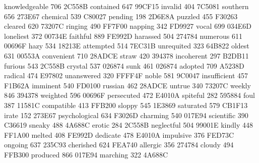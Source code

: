 knowledgeable 706 2C558B contained 647 99CF15 invalid 404 7C5081
southern 656 273E67 chemical 539 C80027 pending 198 2D6E8A puzzled 455
F30263 cleared 620 73207C ringing 490 FF7F00 napping 342 FD9927 vocal
699 034E6D loneliest 372 00734E faithful 889 FE992D harassed 504 274784
numerous 611 00696F hazy 534 18213E attempted 514 7EC31B unrequited 323
64B822 oldest 631 00553A convenient 710 28ADCE straw 420 394378
incoherent 297 B2DB11 furious 543 2C558B crystal 537 026874 sunk 461
026874 adopted 709 A5238D radical 474 E97802 unanswered 320 FFFF4F
noble 581 9C0047 insufficient 457 F1B62A imminent 540 FD0100 russian
462 28ADCE untrue 340 73207C weekly 846 394378 weighted 596 00696F
persecuted 472 E4010A spiteful 282 595884 foul 387 11581C compatible
413 FFB200 sloppy 545 1E3869 saturated 579 CB1F13 irate 152 273E67
psychological 634 F3026D charming 540 017E94 scientific 390 C36619
sneaky 488 4A688C erotic 284 2C558B neglectful 504 99001E kindly 448
FF1A00 melted 408 FE992D dedicate 478 E4010A impulsive 376 FED73C
ongoing 637 235C93 cherished 624 FEA740 allergic 356 274784 cloudy 494
FFB300 produced 866 017E94 marching 322 4A688C
